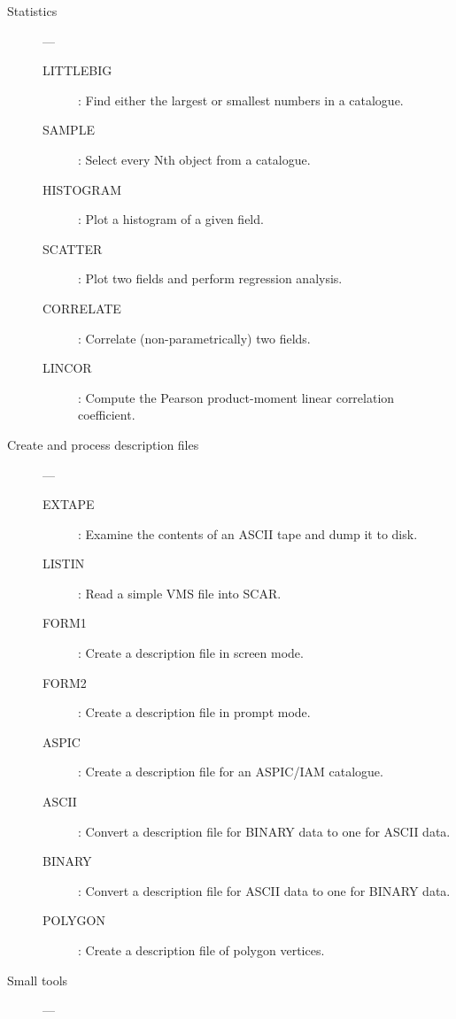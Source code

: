 \begin{description}
\item [Statistics] ---

\begin{description}
\item [LITTLEBIG] : Find either the largest or smallest numbers in a catalogue.
\item [SAMPLE] : Select every Nth object from a catalogue.
\item [HISTOGRAM] : Plot a histogram of a given field.
\item [SCATTER] : Plot two fields and perform regression analysis.
\item [CORRELATE] : Correlate (non-parametrically) two fields.
\item [LINCOR] : Compute the Pearson product-moment linear correlation 
  coefficient.
\end{description}

\item [Create and process description files] ---

\begin{description}
\item [EXTAPE] : Examine the contents of an ASCII tape and dump it to disk.
\item [LISTIN] : Read a simple VMS file into SCAR.
\item [FORM1] : Create a description file in screen mode.
\item [FORM2] : Create a description file in prompt mode.
\item [ASPIC] : Create a description file for an ASPIC/IAM catalogue.
\item [ASCII] : Convert a description file for BINARY data to one for ASCII
 data.
\item [BINARY] : Convert a description file for ASCII data to one for BINARY 
 data.
\item [POLYGON] : Create a description file of polygon vertices.
\end{description}

\item [Small tools] ---


\end{description}
